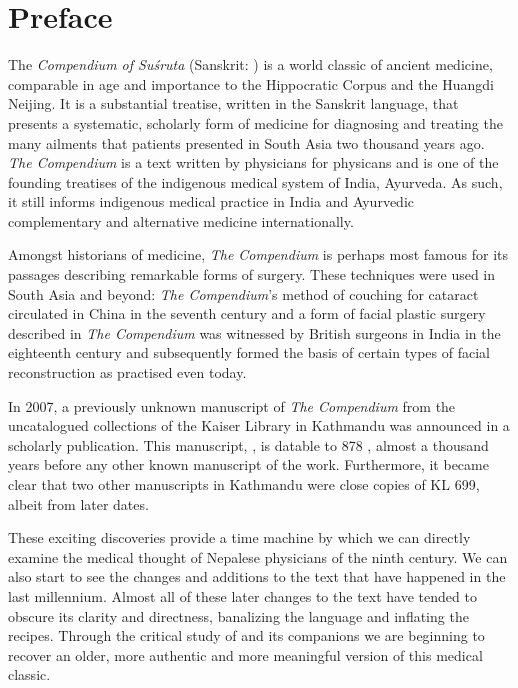 \chapter*{Preface}

The \emph{Compendium of Suśruta} (Sanskrit: \SS) is a world classic of ancient
medicine, comparable in age and importance to the Hippocratic Corpus and the
Huangdi Neijing. It is a substantial treatise, written in the Sanskrit
language, that presents a systematic, scholarly form of medicine for
diagnosing and treating the many ailments that patients presented in South
Asia two thousand years ago. \emph{The Compendium} is a text written by
physicians for physicans and is one of the founding treatises of the
indigenous medical system of India, Ayurveda.  As such, it still informs
indigenous medical practice in India and Ayurvedic complementary and
alternative medicine internationally.

Amongst historians of medicine, \textit{The Compendium} is perhaps most famous
for its passages describing remarkable forms of surgery. These techniques were
used in South Asia and beyond: \emph{The Compendium}'s method of couching for
cataract circulated in China in the seventh century and a form of facial
plastic surgery described in \emph{The Compendium} was witnessed by British
surgeons in India in the eighteenth century and subsequently formed the basis
of certain types of facial reconstruction as practised even today.

In 2007, a previously unknown manuscript of \emph{The Compendium} from the
uncatalogued collections of the Kaiser Library in Kathmandu was announced in a
scholarly publication.  This manuscript, , is datable
to 878 \CE, almost a thousand years before any other known manuscript of the
work. Furthermore, it became clear that two other manuscripts in Kathmandu
were close copies of KL 699, albeit from later dates.

These exciting discoveries provide a time machine by which we can directly
examine the medical thought of Nepalese physicians of the ninth century.  We
can also start to see the changes and additions to the text that have happened
in the last millennium.  Almost all of these later changes to the text have
tended to obscure its clarity and directness, banalizing the language and
inflating the recipes.  Through the critical study of   and its companions we are beginning to recover an older, more authentic
and more meaningful version of this medical classic.

